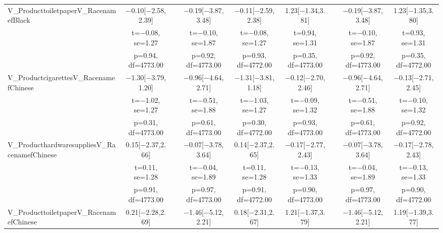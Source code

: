 \documentclass[]{report}
\begin{document}
\begin{table}
{\begin{tabular}[t]{lcccccccc}
		V\_ProducttoiletpaperV\_RacenamefBlack & \num{-0.10}[\num{-2.58},\num{2.39}] &  & \num{-0.19}[\num{-3.87},\num{3.48}] & \num{-0.11}[\num{-2.59},\num{2.38}] & \num{1.23}[\num{-1.34},\num{3.81}] &  & \num{-0.19}[\num{-3.87},\num{3.48}] & \num{1.23}[\num{-1.35},\num{3.80}]\\
		& t=\num{-0.08}, se=\num{1.27} &  & t=\num{-0.10}, se=\num{1.87} & t=\num{-0.08}, se=\num{1.27} & t=\num{0.94}, se=\num{1.31} &  & t=\num{-0.10}, se=\num{1.87} & t=\num{0.93}, se=\num{1.31}\\
		& p=\num{0.94}, df=\num{4773.00} &  & p=\num{0.92}, df=\num{4773.00} & p=\num{0.93}, df=\num{4772.00} & p=\num{0.35}, df=\num{4773.00} &  & p=\num{0.92}, df=\num{4773.00} & p=\num{0.35}, df=\num{4772.00}\\
		V\_ProductcigarettesV\_RacenamefChinese & \num{-1.30}[\num{-3.79},\num{1.20}] &  & \num{-0.96}[\num{-4.64},\num{2.71}] & \num{-1.31}[\num{-3.81},\num{1.18}] & \num{-0.12}[\num{-2.70},\num{2.46}] &  & \num{-0.96}[\num{-4.64},\num{2.71}] & \num{-0.13}[\num{-2.71},\num{2.45}]\\
		& t=\num{-1.02}, se=\num{1.27} &  & t=\num{-0.51}, se=\num{1.88} & t=\num{-1.03}, se=\num{1.27} & t=\num{-0.09}, se=\num{1.32} &  & t=\num{-0.51}, se=\num{1.88} & t=\num{-0.10}, se=\num{1.32}\\
		& p=\num{0.31}, df=\num{4773.00} &  & p=\num{0.61}, df=\num{4773.00} & p=\num{0.30}, df=\num{4772.00} & p=\num{0.93}, df=\num{4773.00} &  & p=\num{0.61}, df=\num{4773.00} & p=\num{0.92}, df=\num{4772.00}\\
		V\_ProducthardwaresuppliesV\_RacenamefChinese & \num{0.15}[\num{-2.37},\num{2.66}] &  & \num{-0.07}[\num{-3.78},\num{3.64}] & \num{0.14}[\num{-2.37},\num{2.65}] & \num{-0.17}[\num{-2.77},\num{2.43}] &  & \num{-0.07}[\num{-3.78},\num{3.64}] & \num{-0.17}[\num{-2.78},\num{2.43}]\\
		& t=\num{0.11}, se=\num{1.28} &  & t=\num{-0.04}, se=\num{1.89} & t=\num{0.11}, se=\num{1.28} & t=\num{-0.13}, se=\num{1.33} &  & t=\num{-0.04}, se=\num{1.89} & t=\num{-0.13}, se=\num{1.33}\\
		& p=\num{0.91}, df=\num{4773.00} &  & p=\num{0.97}, df=\num{4773.00} & p=\num{0.91}, df=\num{4772.00} & p=\num{0.90}, df=\num{4773.00} &  & p=\num{0.97}, df=\num{4773.00} & p=\num{0.90}, df=\num{4772.00}\\
		V\_ProducttoiletpaperV\_RacenamefChinese & \num{0.21}[\num{-2.28},\num{2.69}] &  & \num{-1.46}[\num{-5.12},\num{2.21}] & \num{0.18}[\num{-2.31},\num{2.67}] & \num{1.21}[\num{-1.37},\num{3.79}] &  & \num{-1.46}[\num{-5.12},\num{2.21}] & \num{1.19}[\num{-1.39},\num{3.77}]\\

\end{tabular}}
\end{table}
\end{document}

